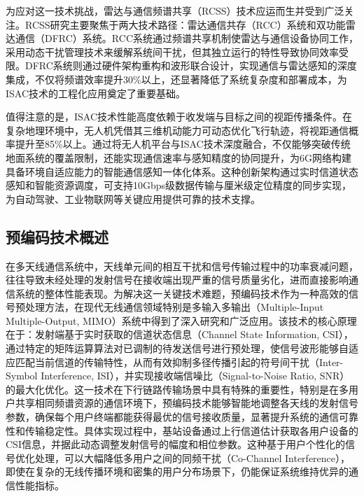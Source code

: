 \documentclass{article}
\begin{document}
    为应对这一技术挑战，雷达与通信频谱共享（RCSS）技术应运而生并受到广泛关注\cite{liu2020radar}。RCSS研究主要聚焦于两大技术路径：雷达通信共存（RCC）系统和双功能雷达通信（DFRC）系统。RCC系统通过频谱共享机制使雷达与通信设备协同工作，采用动态干扰管理技术来缓解系统间干扰，但其独立运行的特性导致协同效率受限。DFRC系统则通过硬件架构重构和波形联合设计，实现通信与雷达感知的深度集成，不仅将频谱效率提升30\%以上，还显著降低了系统复杂度和部署成本\cite{ma2020automotive}，为ISAC技术的工程化应用奠定了重要基础。
    
    值得注意的是，ISAC技术性能高度依赖于收发端与目标之间的视距传播条件。在复杂地理环境中，无人机凭借其三维机动能力可动态优化飞行轨迹，将视距通信概率提升至85\%以上\cite{zhu2024enabling}。通过将无人机平台与ISAC技术深度融合，不仅能够突破传统地面系统的覆盖限制，还能实现通信速率与感知精度的协同提升，为6G网络构建具备环境自适应能力的智能通信感知一体化体系。这种创新架构通过实时信道状态感知和智能资源调度，可支持10Gbps级数据传输与厘米级定位精度的同步实现，为自动驾驶、工业物联网等关键应用提供可靠的技术支撑。

    \subsection{预编码技术概述}

    在多天线通信系统中，天线单元间的相互干扰和信号传输过程中的功率衰减问题，往往导致未经处理的发射信号在接收端出现严重的信号质量劣化，进而直接影响通信系统的整体性能表现。为解决这一关键技术难题，预编码技术作为一种高效的信号预处理方法，在现代无线通信领域特别是多输入多输出（Multiple-Input Multiple-Output, MIMO）系统中得到了深入研究和广泛应用\cite{ye2003optimized}。该技术的核心原理在于：发射端基于实时获取的信道状态信息（Channel State Information, CSI），通过特定的矩阵运算算法对已调制的待发送信号进行预处理，使信号波形能够自适应匹配当前信道的传输特性，从而有效抑制多径传播引起的符号间干扰（Inter-Symbol Interference, ISI），并实现接收端信噪比（Signal-to-Noise Ratio, SNR）的最大化优化。这一技术在下行链路传输场景中具有特殊的重要性，特别是在多用户共享相同频谱资源的通信环境下，预编码技术能够智能地调整各天线的发射信号参数，确保每个用户终端都能获得最优的信号接收质量，显著提升系统的通信可靠性和传输稳定性。具体实现过程中，基站设备通过上行信道估计获取各用户设备的CSI信息，并据此动态调整发射信号的幅度和相位参数。这种基于用户个性化的信号优化处理，可以大幅降低多用户之间的同频干扰（Co-Channel Interference），即使在复杂的无线传播环境和密集的用户分布场景下，仍能保证系统维持优异的通信性能指标。
\end{document}

